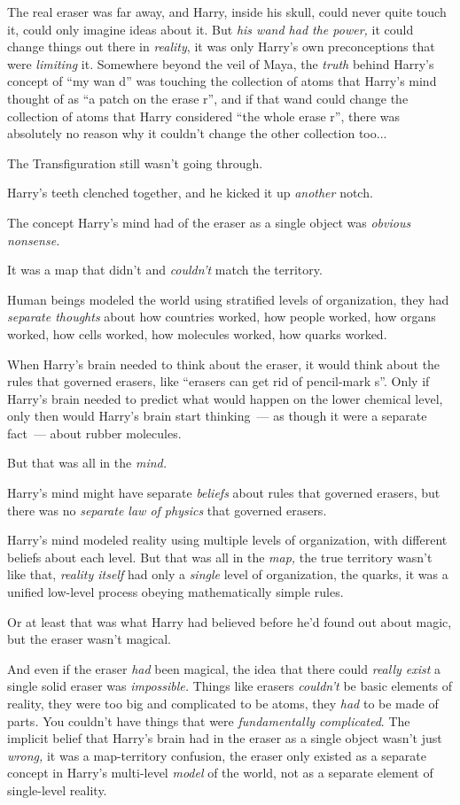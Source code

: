 The real eraser was far away, and Harry, inside his skull, could never quite touch it, could only imagine ideas about it. But \emph{his wand had the power,} it could change things out there in \emph{reality}, it was only Harry's own preconceptions that were \emph{limiting} it. Somewhere beyond the veil of Maya, the \emph{truth} behind Harry's concept of ``my wan d'' was touching the collection of atoms that Harry's mind thought of as ``a patch on the erase r'', and if that wand could change the collection of atoms that Harry considered ``the whole erase r'', there was absolutely no reason why it couldn't change the other collection too...

The Transfiguration still wasn't going through.

Harry's teeth clenched together, and he kicked it up \emph{another} notch.

The concept Harry's mind had of the eraser as a single object was \emph{obvious nonsense.}

It was a map that didn't and \emph{couldn't} match the territory.

Human beings modeled the world using stratified levels of organization, they had \emph{separate thoughts} about how countries worked, how people worked, how organs worked, how cells worked, how molecules worked, how quarks worked.

When Harry's brain needed to think about the eraser, it would think about the rules that governed erasers, like ``erasers can get rid of pencil-mark s''. Only if Harry's brain needed to predict what would happen on the lower chemical level, only then would Harry's brain start thinking~--- as though it were a separate fact~--- about rubber molecules.

But that was all in the \emph{mind.}

Harry's mind might have separate \emph{beliefs} about rules that governed erasers, but there was no \emph{separate law of physics} that governed erasers.

Harry's mind modeled reality using multiple levels of organization, with different beliefs about each level. But that was all in the \emph{map,} the true territory wasn't like that, \emph{reality itself} had only a \emph{single} level of organization, the quarks, it was a unified low-level process obeying mathematically simple rules.

Or at least that was what Harry had believed before he'd found out about magic, but the eraser wasn't magical.

And even if the eraser \emph{had} been magical, the idea that there could \emph{really exist} a single solid eraser was \emph{impossible.} Things like erasers \emph{couldn't} be basic elements of reality, they were too big and complicated to be atoms, they \emph{had} to be made of parts\emph{.} You couldn't have things that were \emph{fundamentally complicated}. The implicit belief that Harry's brain had in the eraser as a single object wasn't just \emph{wrong,} it was a map-territory confusion, the eraser only existed as a separate concept in Harry's multi-level \emph{model} of the world, not as a separate element of single-level reality.

